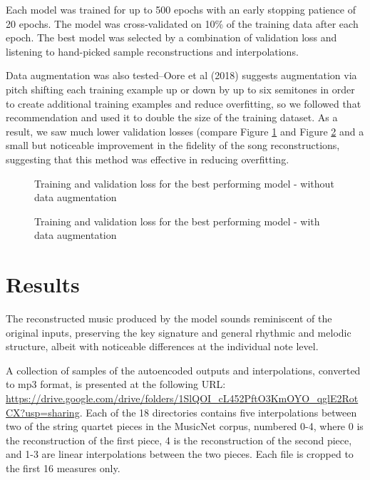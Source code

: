 \documentclass[sigconf,authorversion]{acmart}
\begin{document}
Each model was trained for up to 500 epochs with an early stopping
patience of 20 epochs. The model was cross-validated on 10\% of the
training data after each epoch. The best model was selected by a
combination of validation loss and listening to hand-picked sample
reconstructions and interpolations.

Data augmentation was also tested--Oore et al (2018)
\cite{oore_this_2018} suggests augmentation via pitch shifting each
training example up or down by up to six semitones in order to create
additional training examples and reduce overfitting, so we followed
that recommendation and used it to double the size of the training
dataset. As a result, we saw much lower validation losses (compare
Figure \ref{loss} and Figure \ref{loss_augment} and a small but
noticeable improvement in the fidelity of the song reconstructions,
suggesting that this method was effective in reducing overfitting.

\begin{figure}[htbp]
    \begin{center}
        \scalebox{0.5}{}
    \end{center}
    \caption{Training and validation loss for the best performing model - without data augmentation}
    \label{loss}
\end{figure}

\begin{figure}[htbp]
    \begin{center}
        \scalebox{0.5}{}
    \end{center}
    \caption{Training and validation loss for the best performing model - with data augmentation}
    \label{loss_augment}
\end{figure}


\section{Results}

The reconstructed music produced by the model sounds reminiscent of
the original inputs, preserving the key signature and general rhythmic
and melodic structure, albeit with noticeable differences at the
individual note level.

A collection of samples of the autoencoded outputs and interpolations,
converted to mp3 format, is presented at the following URL:
\url{https://drive.google.com/drive/folders/1SlQOI_cL452PftO3KmOYO_qglE2RotCX?usp=sharing}.
Each of the 18 directories contains five interpolations between two of
the string quartet pieces in the MusicNet corpus, numbered 0-4, where
0 is the reconstruction of the first piece, 4 is the reconstruction of
the second piece, and 1-3 are linear interpolations between the two
pieces. Each file is cropped to the first 16 measures only.
\end{document}
